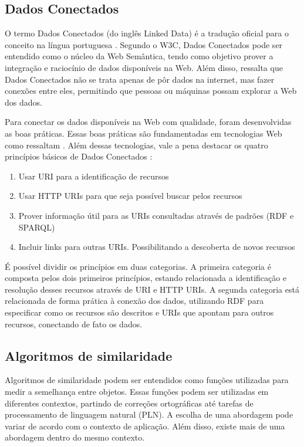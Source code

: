 \subsection{Dados Conectados}
O termo Dados Conectados (do inglês Linked Data) é a tradução oficial para o conceito na língua portuguesa \cite{Isotani2015}. Segundo o W3C, Dados Conectados pode ser entendido como o núcleo da Web Semântica, tendo como objetivo prover a integração e raciocínio de dados disponíveis na Web. Além disso,  ressalta que Dados Conectados não se trata apenas de pôr dados na internet, mas fazer conexões entre eles, permitindo que pessoas ou máquinas possam explorar a Web dos dados.

Para conectar os dados disponíveis na Web com qualidade, foram desenvolvidas as boas práticas. Essas boas práticas são fundamentadas em tecnologias Web como ressaltam . Além dessas tecnologias, vale a pena destacar os quatro princípios básicos de Dados Conectados \cite{berners2006linked}: 

\begin{enumerate}
	\item Usar URI para a identificação de recursos
	\item Usar HTTP URIs para que seja possível buscar pelos recursos 
	\item Prover informação útil para as URIs consultadas através de padrões (RDF e SPARQL) 
	\item Incluir links para outras URIs. Possibilitando a descoberta de novos recursos
\end{enumerate}

É possível dividir os princípios em duas categorias. A primeira categoria é composta pelos dois primeiros princípios, estando relacionada a identificação e resolução desses recursos através de URI e HTTP URIs. A segunda categoria está relacionada de forma prática à conexão dos dados, utilizando RDF para especificar como os recursos são descritos e URIs que apontam para outros recursos, conectando de fato os dados.

\subsection{Algoritmos de similaridade}

Algoritmos de similaridade podem ser entendidos como funções utilizadas para medir a semelhança entre objetos. Essas funções podem ser utilizadas em diferentes contextos, partindo de correções ortográficas até tarefas de processamento de linguagem natural (PLN). A escolha de uma abordagem pode variar de acordo com o contexto de aplicação. Além disso, existe mais de uma abordagem dentro do mesmo contexto. 

